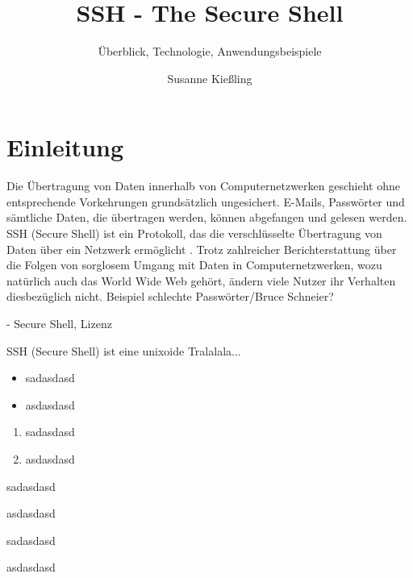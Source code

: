 \documentclass[ngerman,pdf]{wkcms}    %
\title{SSH - The Secure Shell}
\subtitle{Überblick, Technologie, Anwendungsbeispiele}
\author{Susanne Kießling}
\date{\todaylong}
\begin{document}
\maketitle


\section{Einleitung}

Die Übertragung von Daten innerhalb von Computernetzwerken geschieht ohne
entsprechende Vorkehrungen grundsätzlich ungesichert. E-Mails, Passwörter und sämtliche Daten, die übertragen werden, können abgefangen und gelesen werden. SSH (Secure Shell) ist ein Protokoll, das die verschlüsselte Übertragung von Daten über ein Netzwerk ermöglicht \cite{SSH}.
Trotz zahlreicher Berichterstattung über die Folgen von sorglosem Umgang mit Daten in Computernetzwerken, wozu natürlich auch das World Wide Web gehört, ändern viele Nutzer
ihr Verhalten diesbezüglich nicht. Beispiel schlechte Passwörter/Bruce Schneier?
 
 - Secure Shell, Lizenz   


SSH (Secure Shell) ist eine unixoide \cite{knuthwebsite} Tralalala...

\begin{itemize}
  \item sadasdasd
  \item asdasdasd
\end{itemize}
\begin{enumerate}
  \item sadasdasd
  \item asdasdasd
\end{enumerate}
\begin{enumerateArabic}
  \item sadasdasd
  \item asdasdasd
\end{enumerateArabic}
\begin{enumerateRoman}
  \item sadasdasd
  \item asdasdasd
\end{enumerateRoman}
\end{document}
